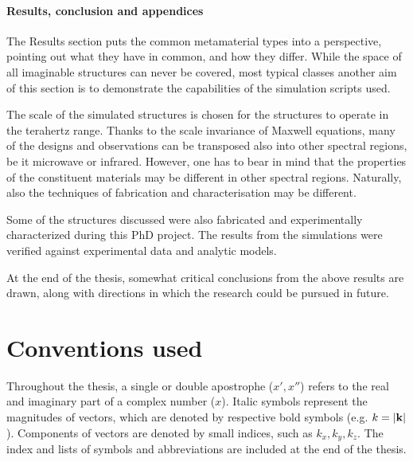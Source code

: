 \paragraph{Results, conclusion and appendices} %
The Results section puts the common metamaterial types into a perspective, pointing out what they have in common, and how they differ.  %
While the space of all imaginable structures can never be covered, most typical classes  another aim of this section is to demonstrate the capabilities of the simulation scripts used. 

The scale of the simulated structures is chosen for the structures to operate in the terahertz range. 
Thanks to the scale invariance of Maxwell equations, many of the designs and observations can be transposed also into other spectral regions, be it microwave or infrared. However, one has to bear in mind that the properties of the constituent materials may be different in other spectral regions. Naturally, also the techniques of fabrication and characterisation may be different.

Some of the structures discussed were also fabricated and experimentally characterized during this PhD project. 
The results from the simulations were verified against experimental data and analytic models.

At the end of the thesis, somewhat critical conclusions from the above results are drawn, along with directions in which the research could be pursued in future.


\section{Conventions used}%
Throughout the thesis, a single or double apostrophe ($x', x''$) refers to the real and imaginary part of a complex number ($x$). Italic symbols represent the magnitudes of vectors, which are denoted by respective bold symbols (e.g. $k = |{\mathbf{k}}|$). Components of vectors are denoted by small indices, such as $k_x, k_y, k_z$. 
The index and lists of symbols and abbreviations are included at the end of the thesis.

